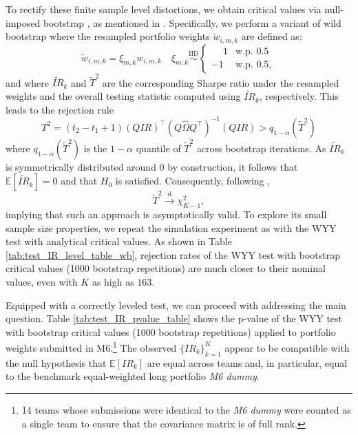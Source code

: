 \documentclass[3p,times,twocolumn]{elsarticle}
\begin{document}
To rectify these finite sample level distortions, we obtain critical values via null-imposed bootstrap \citep[see][section 1.8]{politisSubsampling1999}, as mentioned in \citet{ledoitRobustPerformanceHypothesis2008}.
Specifically, we perform a variant of wild bootstrap where the resampled portfolio weights $\tilde{w}_{i,m,k}$ are defined as:
\begin{equation}
    \tilde{w}_{i,m,k}=\xi_{m,k} w_{i,m,k} \quad \xi_{m,k}\stackrel{\text{IID}}{\sim}
\begin{cases}
    \phantom{-}1 & \text{w.p. } 0.5 \\
    -1 & \text{w.p. } 0.5,
\end{cases}
\end{equation}
and where $\tilde{IR}_{k}$ and $\tilde{T}^{2}$ are the corresponding Sharpe ratio under the resampled weights and the overall testing statistic computed using $\tilde{IR}_{k}$, respectively.
This leads to the rejection rule
\begin{equation}
    T^2 = (t_{2}-t_{1}+1)(QIR)^{\top}(Q\hat{\Omega} Q^{\top})^{-1}(QIR) > q_{1-\alpha}(\tilde{T}^{2})
\end{equation}
where $q_{1-\alpha}(\tilde{T}^{2})$ is the $1-\alpha$ quantile of $\tilde{T}^{2}$ across bootstrap iterations.
As $\tilde{IR}_{k}$ is symmetrically distributed around $0$ by construction, it follows that $\mathbb{E}[\tilde{IR}_{k}]=0$ and that $H_{0}$ is satisfied.
Consequently, following \citet{wrightTestEqualityMultiple2014}, 
\begin{equation}
    \tilde{T}^{2} \stackrel{\text{d}}{\rightarrow} \chi_{K-1}^{2},
\end{equation}
implying that such an approach is asymptotically valid.
To explore its small sample size properties, we repeat the simulation experiment as with the WYY test with analytical critical values.
As shown in Table \ref{tab:test_IR_level_table_wb}, rejection rates of the WYY test with bootstrap critical values (1000 bootstrap repetitions) are much closer to their nominal values, even with $K$ as high as $163$.

Equipped with a correctly leveled test, we can proceed with addressing the main question.
Table \ref{tab:test_IR_pvalue_table} shows the p-value of the WYY test with bootstrap critical values (1000 bootstrap repetitions) applied to portfolio weights submitted in M6.\footnote{
    14 teams whose submissions were identical to the \emph{M6 dummy} were counted as a single team to ensure that the covariance matrix is of full rank.
} %
The observed $\{IR_{k}\}_{k=1}^{K}$ appear to be compatible with the null hypothesis that $\mathbb{E}[IR_{k}]$ are equal across teams and, in particular, equal to the benchmark equal-weighted long portfolio \emph{M6 dummy}.
\end{document}
